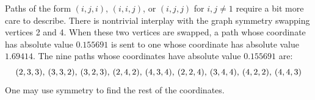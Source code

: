 Paths of the form $(i,j,i)$, $(i,i,j)$, or $(i,j,j)$ for $i,j\neq1$ require a bit more care to describe. 
There is nontrivial interplay with the graph symmetry swapping vertices 2 and 4. 
When these two vertices are swapped, a path whose coordinate has absolute value $0.155691$ is sent to one whose coordinate has absolute value $1.69414$. 
The nine paths whose coordinates have absolute value $0.155691$ are:
\[
    (2,3,3),\hspace{0.2em} (3,3,2),\hspace{0.2em} (3,2,3),\hspace{0.2em} (2,4,2),\hspace{0.2em} (4,3,4),\hspace{0.2em} (2,2,4),\hspace{0.2em} (3,4,4),\hspace{0.2em} (4,2,2),\hspace{0.2em} (4,4,3) 
\]
One may use symmetry to find the rest of the coordinates.

